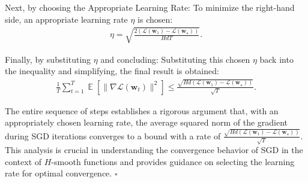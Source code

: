 \documentclass[letterpaper]{article}
\newcommand{\E}{\mathop{\mathbb{E}}}
\renewcommand{\L}{\mathcal{L}}
\newcommand{\bw}{\mathbf{w}}
\renewcommand{\qedsymbol}{\hfill $\square$}
\begin{document}
\begin{enumerate}
\begin{enumerate}
        Next, by choosing the Appropriate Learning Rate: To minimize the right-hand side, an appropriate learning rate \(\eta\) is chosen:
        \begin{equation}
        	\begin{aligned}
        		\eta = \sqrt{\frac{2(\L(\bw_1) - \L(\bw_\star))}{H d T}}.
        	\end{aligned}
        \end{equation}
        
        Finally, by substituting \(\eta\) and concluding: Substituting this chosen \(\eta\) back into the inequality and simplifying, the final result is obtained:
        \begin{equation}
        	\begin{aligned}
        		\frac{1}{T} \sum_{t=1}^T \E[\|\nabla \L(\bw_t)\|^2] \le \frac{\sqrt{H d (\L(\bw_1) - \L(\bw_\star))}}{\sqrt{T}}.
        	\end{aligned}
        \end{equation}
        
        The entire sequence of steps establishes a rigorous argument that, with an appropriately chosen learning rate, the average squared norm of the gradient during SGD iterations converges to a bound with a rate of \(\frac{\sqrt{H d (\L(\bw_1) - \L(\bw_\star))}}{\sqrt{T}}\). This analysis is crucial in understanding the convergence behavior of SGD in the context of \(H\)-smooth functions and provides guidance on selecting the learning rate for optimal convergence.
        \qedsymbol
        
    \end{enumerate}
    \end{enumerate}
\end{document}
